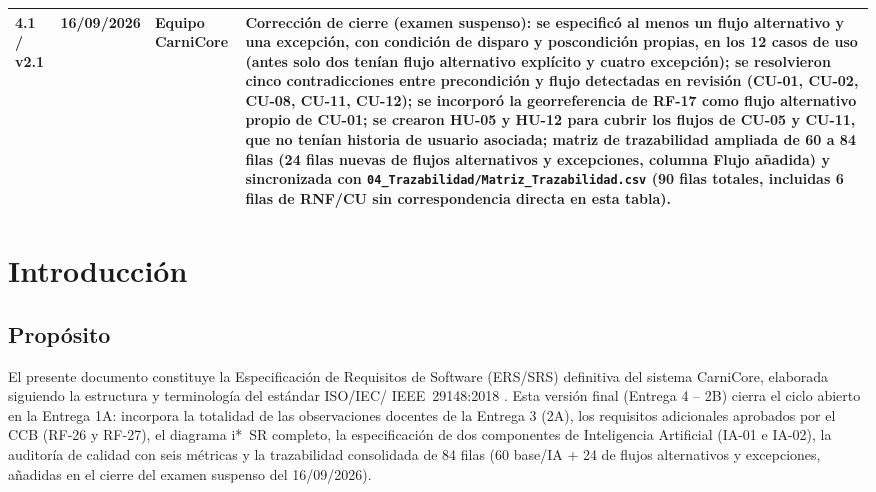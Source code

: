 \documentclass[11pt,a4paper]{article}
\begin{document}
\begin{longtable}{|p{1.5cm}|p{2.2cm}|p{3cm}|p{8cm}|}
\hline
\textbf{4.1 / v2.1} & \textbf{16/09/2026} & \textbf{Equipo CarniCore} & \textbf{Corrección de cierre (examen suspenso):} se especificó al menos un flujo alternativo y una excepción, con condición de disparo y poscondición propias, en los 12 casos de uso (antes solo dos tenían flujo alternativo explícito y cuatro excepción); se resolvieron cinco contradicciones entre precondición y flujo detectadas en revisión (CU-01, CU-02, CU-08, CU-11, CU-12); se incorporó la georreferencia de RF-17 como flujo alternativo propio de CU-01; se crearon HU-05 y HU-12 para cubrir los flujos de CU-05 y CU-11, que no tenían historia de usuario asociada; matriz de trazabilidad ampliada de 60 a 84 filas (24 filas nuevas de flujos alternativos y excepciones, columna Flujo añadida) y sincronizada con \texttt{04\_Trazabilidad/Matriz\_Trazabilidad.csv} (90 filas totales, incluidas 6 filas de RNF/CU sin correspondencia directa en esta tabla). \\
\hline
\end{longtable}

\renewcommand{\contentsname}{\'{I}ndice}
\renewcommand{\listtablename}{\'{I}ndice de Tablas}
\renewcommand{\listfigurename}{\'{I}ndice de Figuras}

\newpage
\tableofcontents
\newpage
\listoftables
\newpage
\listoffigures
\newpage

\section{Introducción}
\subsection{Propósito}

El presente documento constituye la Especificación de Requisitos de Software (ERS/SRS) definitiva del sistema CarniCore, elaborada siguiendo la estructura y terminología del estándar ISO/IEC/ IEEE~29148:2018 \cite{iso29148}. Esta versión final (Entrega 4 -- 2B) cierra el ciclo abierto en la Entrega 1A: incorpora la totalidad de las observaciones docentes de la Entrega 3 (2A), los requisitos adicionales aprobados por el CCB (RF-26 y RF-27), el diagrama i*~SR completo, la especificación de dos componentes de Inteligencia Artificial (IA-01 e IA-02), la auditoría de calidad con seis métricas y la trazabilidad consolidada de 84 filas (60 base/IA + 24 de flujos alternativos y excepciones, añadidas en el cierre del examen suspenso del 16/09/2026).
\end{document}

